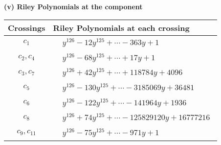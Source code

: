 \documentclass[1p]{elsarticle_modified}
\theoremstyle{definition}
\begin{document}
\newpage\renewcommand{\arraystretch}{1}
\flushleft \textbf{(v) Riley Polynomials at the component}\newline \\
\begin{tabular}{m{50pt}|m{274pt}}
Crossings & \hspace{64pt}Riley Polynomials at each crossing \\
\hline $$\begin{aligned}c_{1}\end{aligned}$$&$\begin{aligned}
&y^{126}-12 y^{125}+\cdots-363 y+1
\end{aligned}$\\
\hline $$\begin{aligned}c_{2},c_{4}\end{aligned}$$&$\begin{aligned}
&y^{126}-68 y^{125}+\cdots+17 y+1
\end{aligned}$\\
\hline $$\begin{aligned}c_{3},c_{7}\end{aligned}$$&$\begin{aligned}
&y^{126}+42 y^{125}+\cdots+118784 y+4096
\end{aligned}$\\
\hline $$\begin{aligned}c_{5}\end{aligned}$$&$\begin{aligned}
&y^{126}-130 y^{125}+\cdots-3185069 y+36481
\end{aligned}$\\
\hline $$\begin{aligned}c_{6}\end{aligned}$$&$\begin{aligned}
&y^{126}-122 y^{125}+\cdots-141964 y+1936
\end{aligned}$\\
\hline $$\begin{aligned}c_{8}\end{aligned}$$&$\begin{aligned}
&y^{126}+74 y^{125}+\cdots-125829120 y+16777216
\end{aligned}$\\
\hline $$\begin{aligned}c_{9},c_{11}\end{aligned}$$&$\begin{aligned}
&y^{126}-75 y^{125}+\cdots-971 y+1
\end{aligned}$\\

\end{tabular}
\end{document}
